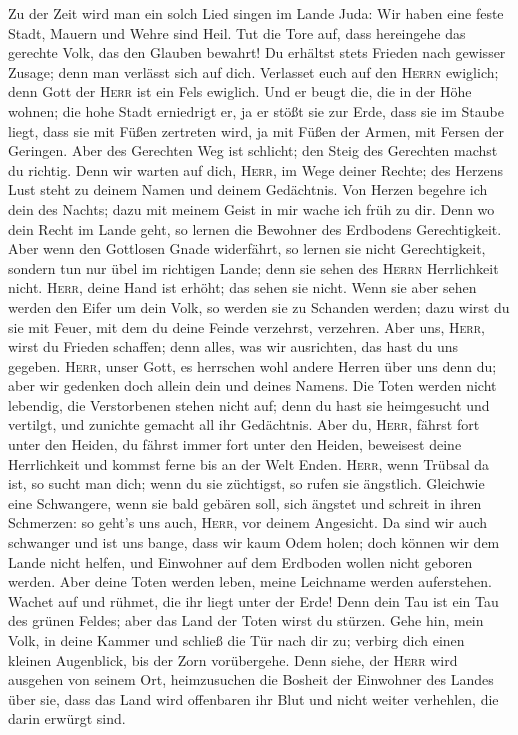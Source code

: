  Zu der Zeit wird man ein solch Lied singen im Lande Juda:
Wir haben eine feste Stadt, Mauern und Wehre sind Heil. 
Tut die Tore auf, dass hereingehe das gerechte Volk, das den Glauben
bewahrt!  Du erhältst stets Frieden nach gewisser Zusage;
denn man verlässt sich auf dich.  Verlasset euch auf den
\textsc{Herrn} ewiglich; denn Gott der \textsc{Herr} ist ein Fels
ewiglich.  Und er beugt die, die in der Höhe wohnen; die
hohe Stadt erniedrigt er, ja er stößt sie zur Erde, dass sie im Staube
liegt,  dass sie mit Füßen zertreten wird, ja mit Füßen
der Armen, mit Fersen der Geringen.  Aber des Gerechten
Weg ist schlicht; den Steig des Gerechten machst du richtig.
 Denn wir warten auf dich, \textsc{Herr}, im Wege deiner
Rechte; des Herzens Lust steht zu deinem Namen und deinem Gedächtnis.
 Von Herzen begehre ich dein des Nachts; dazu mit meinem
Geist in mir wache ich früh zu dir. Denn wo dein Recht im Lande geht, so
lernen die Bewohner des Erdbodens Gerechtigkeit.  Aber
wenn den Gottlosen Gnade widerfährt, so lernen sie nicht Gerechtigkeit,
sondern tun nur übel im richtigen Lande; denn sie sehen des
\textsc{Herrn} Herrlichkeit nicht.  \textsc{Herr}, deine
Hand ist erhöht; das sehen sie nicht. Wenn sie aber sehen werden den
Eifer um dein Volk, so werden sie zu Schanden werden; dazu wirst du sie
mit Feuer, mit dem du deine Feinde verzehrst, verzehren. 
Aber uns, \textsc{Herr}, wirst du Frieden schaffen; denn alles, was wir
ausrichten, das hast du uns gegeben.  \textsc{Herr},
unser Gott, es herrschen wohl andere Herren über uns denn du; aber wir
gedenken doch allein dein und deines Namens.  Die Toten
werden nicht lebendig, die Verstorbenen stehen nicht auf; denn du hast
sie heimgesucht und vertilgt, und zunichte gemacht all ihr Gedächtnis.
 Aber du, \textsc{Herr}, fährst fort unter den Heiden, du
fährst immer fort unter den Heiden, beweisest deine Herrlichkeit und
kommst ferne bis an der Welt Enden.  \textsc{Herr}, wenn
Trübsal da ist, so sucht man dich; wenn du sie züchtigst, so rufen sie
ängstlich.  Gleichwie eine Schwangere, wenn sie bald
gebären soll, sich ängstet und schreit in ihren Schmerzen: so geht's uns
auch, \textsc{Herr}, vor deinem Angesicht.  Da sind wir
auch schwanger und ist uns bange, dass wir kaum Odem holen; doch können
wir dem Lande nicht helfen, und Einwohner auf dem Erdboden wollen nicht
geboren werden.  Aber deine Toten werden leben, meine
Leichname werden auferstehen. Wachet auf und rühmet, die ihr liegt unter
der Erde! Denn dein Tau ist ein Tau des grünen Feldes; aber das Land der
Toten wirst du stürzen.  Gehe hin, mein Volk, in deine
Kammer und schließ die Tür nach dir zu; verbirg dich einen kleinen
Augenblick, bis der Zorn vorübergehe.  Denn siehe, der
\textsc{Herr} wird ausgehen von seinem Ort, heimzusuchen die Bosheit der
Einwohner des Landes über sie, dass das Land wird offenbaren ihr Blut
und nicht weiter verhehlen, die darin erwürgt sind.


